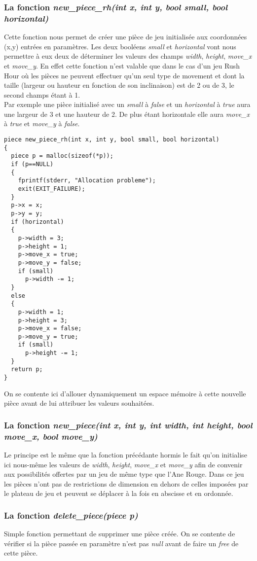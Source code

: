 \documentclass{report}
\begin{document}
\subsubsection*{La fonction \textit{new\_piece\_rh(int x, int y, bool small, bool horizontal)}}
Cette fonction nous permet de créer une pièce de jeu initialisée aux coordonnées (x,y) entrées en paramètres. Les deux booléens \textit{small} et \textit{horizontal} vont nous permettre à eux deux de déterminer les valeurs des champs \textit{width}, \textit{height}, \textit{move\_x} et \textit{move\_y}. En effet cette fonction n'est valable que dans le cas d'un jeu Rush Hour où les pièces ne peuvent effectuer qu'un seul type de movement et dont la taille (largeur ou hauteur en fonction de son inclinaison) est de 2 ou de 3, le second champs étant à 1.\\
Par exemple une pièce initialisé avec un \textit{small} à \textit{false} et un \textit{horizontal} à \textit{true} aura une largeur de 3 et une hauteur de 2. De plus étant horizontale elle aura \textit{move\_x} à \textit{true} et \textit{move\_y} à \textit{false}.
\begin{lstlisting}
piece new_piece_rh(int x, int y, bool small, bool horizontal)
{
  piece p = malloc(sizeof(*p));
  if (p==NULL)
  {
    fprintf(stderr, "Allocation probleme");
    exit(EXIT_FAILURE);
  }
  p->x = x;
  p->y = y;
  if (horizontal)
  {
    p->width = 3;
    p->height = 1;
    p->move_x = true;
    p->move_y = false;
    if (small)
      p->width -= 1;
  }
  else
  {
    p->width = 1;
    p->height = 3;
    p->move_x = false;
    p->move_y = true;
    if (small)
      p->height -= 1;
  }
  return p;
}
\end{lstlisting}
On se contente ici d'allouer dynamiquement un espace mémoire à cette nouvelle pièce avant de lui attribuer les valeurs souhaitées.
\subsubsection*{La fonction \textit{new\_piece(int x, int y, int width, int height, bool move\_x, bool move\_y)}}
Le principe est le même que la fonction précédante hormis le fait qu'on initialise ici nous-même les valeurs de \textit{width}, \textit{height}, \textit{move\_x} et \textit{move\_y} afin de convenir aux possibilités offertes par un jeu de même type que l'Ane Rouge. Dans ce jeu les pièces n'ont pas de restrictions de dimension en dehors de celles imposées par le plateau de jeu et peuvent se déplacer à la fois en abscisse et en ordonnée.
\subsubsection*{La fonction \textit{delete\_piece(piece p)}}
Simple fonction permettant de supprimer une pièce créée. On se contente de vérifier si la pièce passée en paramètre n'est pas \textit{null} avant de faire un \textit{free} de cette pièce.
\end{document}
